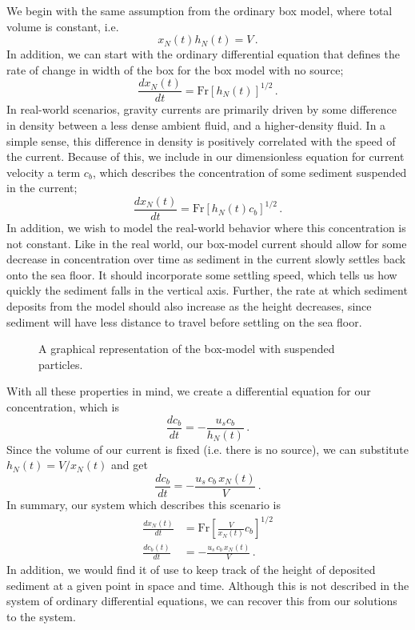 	We begin with the same assumption from the ordinary box model, where total volume is constant, i.e.
	\begin{equation}
		x_N(t)h_N(t) = V \,.
	\end{equation}
	In addition, we can start with the ordinary differential equation that defines the rate of change in width of the box for the box model with no source;
	\begin{equation}
		\frac{dx_N(t)}{dt} = \text{Fr}\left[h_N(t)\right]^{1/2}\,.
	\end{equation}
	In real-world scenarios, gravity currents are primarily driven by some difference in density between a less dense ambient fluid, and a higher-density fluid. In a simple sense,  this difference in density is positively correlated with the speed of the current. Because of this, we include in our dimensionless equation for current velocity a term \(c_b\), which describes the concentration of some sediment suspended in the current;
	\begin{equation}
		\frac{dx_N(t)}{dt} = \text{Fr}\left[h_N(t) c_b\right]^{1/2} \,.
	\end{equation}
	In addition, we wish to model the real-world behavior where this concentration is not constant. Like in the real world, our box-model current should allow for some decrease in concentration over time as sediment in the current slowly settles back onto the sea floor. It should incorporate some settling speed, which tells us how quickly the sediment falls in the vertical axis. Further, the rate at which sediment deposits from the model should also increase as the height decreases, since sediment will have less distance to travel before settling on the sea floor.
	
	\begin{figure}[H]
		\centering
		\caption{A graphical representation of the box-model with suspended particles.}
	\end{figure}

	With all these properties in mind, we create a differential equation for our concentration, which is
	\begin{equation}
		\frac{dc_b}{dt} = - \frac{u_s c_b }{h_N(t)}\,.
	\end{equation}
	Since the volume of our current is fixed (i.e. there is no source), we can substitute \(h_N(t) = V / x_N(t)\) and get
	\begin{equation}
		\frac{dc_b}{dt} = -\frac{u_s \, c_b \, x_N(t)}{V}\,.
	\end{equation}
	In summary, our system which describes this scenario is
	\begin{align}
		\frac{dx_N(t)}{dt} & = \text{Fr} \left[\frac{V }{x_N(t)}c_b\right]^{1/2}\\
		\frac{dc_b(t)}{dt} & = -\frac{u_s \, c_b \, x_N(t)}{V}\,.
	\end{align}
	In addition, we would find it of use to keep track of the height of deposited sediment at a given point in space and time. Although this is not described in the system of ordinary differential equations, we can recover this from our solutions to the system.

